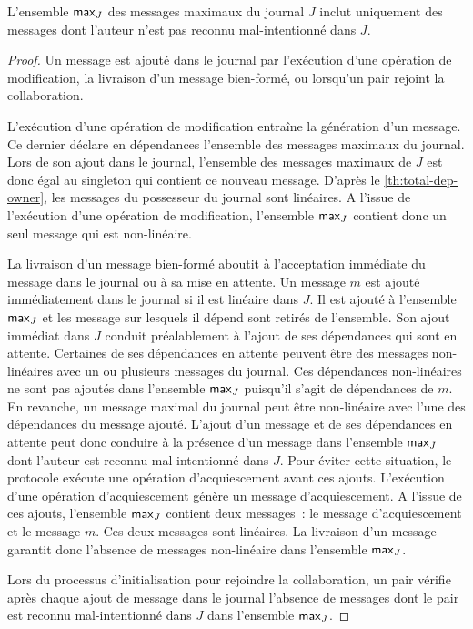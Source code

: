 \begin{lemma}\label{th:max-without-known-malicious}
L'ensemble $\operatorname{\mathsf{max}}_J$ des messages maximaux du journal $J$ inclut uniquement des messages dont l'auteur n'est pas reconnu mal-intentionné dans $J$.
\end{lemma}
\begin{proof}
Un message est ajouté dans le journal par l'exécution d'une opération de modification, la livraison d'un message bien-formé, ou lorsqu'un pair rejoint la collaboration.

L'exécution d'une opération de modification entraîne la génération d'un message.
Ce dernier déclare en dépendances l'ensemble des messages maximaux du journal.
Lors de son ajout dans le journal, l'ensemble des messages maximaux de $J$ est donc égal au singleton qui contient ce nouveau message.
D'après le \autoref{th:total-dep-owner}, les messages du possesseur du journal sont linéaires.
A l'issue de l'exécution d'une opération de modification, l'ensemble $\operatorname{\mathsf{max}}_J$ contient donc un seul message qui est non-linéaire.

La livraison d'un message bien-formé aboutit à l'acceptation immédiate du message dans le journal ou à sa mise en attente.
Un message $m$ est ajouté immédiatement dans le journal si il est linéaire dans $J$.
Il est ajouté à l'ensemble $\operatorname{\mathsf{max}}_J$ et les message sur lesquels il dépend sont retirés de l'ensemble.
Son ajout immédiat dans $J$ conduit préalablement à l'ajout de ses dépendances qui sont en attente.
Certaines de ses dépendances en attente peuvent être des messages non-linéaires avec un ou plusieurs messages du journal.
Ces dépendances non-linéaires ne sont pas ajoutés dans l'ensemble $\operatorname{\mathsf{max}}_J$ puisqu'il s'agit de dépendances de $m$.
En revanche, un message maximal du journal peut être non-linéaire avec l'une des dépendances du message ajouté.
L'ajout d'un message et de ses dépendances en attente peut donc conduire à la présence d'un message dans l'ensemble $\operatorname{\mathsf{max}}_J$ dont l'auteur est reconnu mal-intentionné dans $J$.
Pour éviter cette situation, le protocole exécute une opération d'acquiescement avant ces ajouts.
L'exécution d'une opération d'acquiescement génère un message d'acquiescement.
A l'issue de ces ajouts, l'ensemble $\operatorname{\mathsf{max}}_J$ contient deux messages~: le message d'acquiescement et le message $m$.
Ces deux messages sont linéaires.
La livraison d'un message garantit donc l'absence de messages non-linéaire dans l'ensemble $\operatorname{\mathsf{max}}_J$.

Lors du processus d'initialisation pour rejoindre la collaboration, un pair vérifie après chaque ajout de message dans le journal l'absence de messages dont le pair est reconnu mal-intentionné dans $J$ dans l'ensemble $\operatorname{\mathsf{max}}_J$.
\end{proof}

